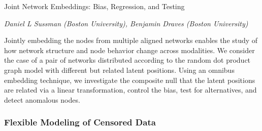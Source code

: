 \begin{itemize}
Joint Network Embeddings: Bias, Regression, and Testing

\emph{\footnotesize Daniel L Sussman (Boston University), Benjamin Draves (Boston University)}

Jointly embedding the nodes from multiple aligned networks enables the study of how network structure and node behavior change across modalities. We consider the case of a pair of networks distributed according to the random dot product graph model with different but related latent positions. Using an omnibus embedding technique, we investigate the composite null that the latent positions are related via a linear transformation, control the bias, test for alternatives, and detect anomalous nodes.

\end{itemize}

\subsubsection*{Flexible Modeling of Censored Data}

